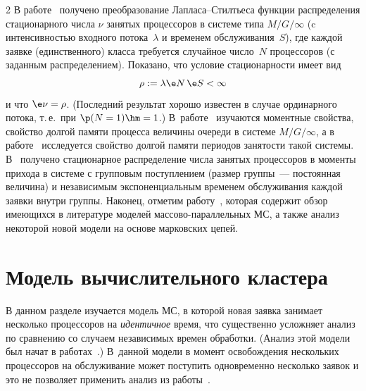 \begin{multicols}{2}
 В работе~\cite{tihonenko}  получено  преобразование Лап\-ла\-са--Стил\-ть\-еса
функции распределения стационарного числа $\nu$ занятых процессоров
в системе типа $M/G/\infty$ (c интенсивностью входного потока~$\lambda$  
и временем обслуживания~$S$), где каждой заявке
(единственного) класса требуется случайное  чис\-ло~$N$ процессоров (с
заданным распределением). Показано,  что  условие стационарности
имеет вид
\begin{equation}
\label{tihon1}
    \rho:=\lambda \e N\, \e S<\infty
\end{equation}
и что  $\e\nu =\rho$. (Последний  результат хорошо известен в случае
ординарного потока, т.\,е.\ при $\p(N=1)\hm=1$.) В~работе~\cite{eliazar}
изучаются моментные свойства,  свойство долгой
памяти  процесса величины очереди в системе $M/G/\infty$, а в
работе~\cite{daley-busy} исследуется  свойство долгой памяти
периодов занятости такой системы. В~\cite{brandt} получено
стационарное распределение  числа занятых процессоров в моменты
прихода в системе с групповым поступлением (размер группы~---
постоянная величина) и  независимым экспоненциальным временем
обслуживания каждой заявки внутри группы. Наконец, отметим
работу~\cite{krampe10}, которая содержит обзор име\-ющих\-ся в
литературе моделей мас\-со\-во-па\-рал\-лель\-ных МС, а также анализ некоторой новой
модели на основе марковских цепей.

\section{Модель вычислительного кластера}\label{sec3}

В данном разделе изучается модель МС, в которой новая заявка
занимает несколько процессоров на {\it идентичное} время, что
существенно усложняет  анализ по сравнению со случаем независимых
времен обработки. (Анализ этой модели был начат  в
работах~\cite{pavt11, rudn11}.)  В~данной модели в момент
освобождения нескольких процессоров на обслуживание может поступить
одновременно несколько заявок и это не позволяет  применить анализ
из работы~\cite{green80}.


\end{multicols}

